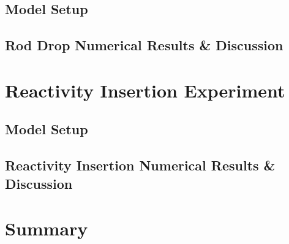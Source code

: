 \subsection{Model Setup}

\subsection{Rod Drop Numerical Results \& Discussion}

\section{Reactivity Insertion Experiment} \label{sec:reactivity-insertion}

\subsection{Model Setup}

\subsection{Reactivity Insertion Numerical Results \& Discussion}

\section{Summary} \label{sec:transient-summary}
